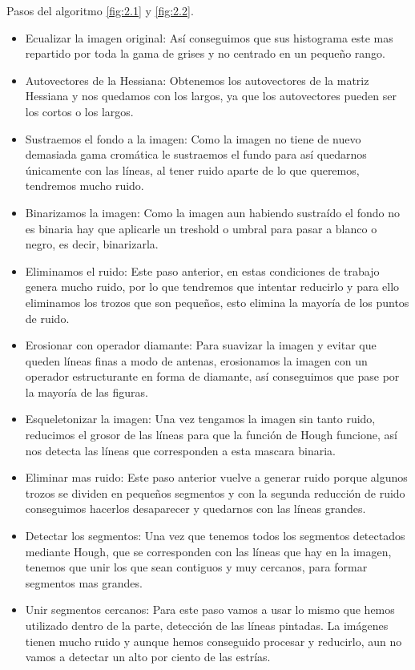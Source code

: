 Pasos del algoritmo \ref{fig:2.1} y \ref{fig:2.2}.
\begin{itemize}
	\item Ecualizar la imagen original:
Así conseguimos que sus histograma este mas repartido por toda la gama de grises y no centrado en un pequeño rango.
	\item Autovectores de la Hessiana:
Obtenemos los autovectores de la matriz Hessiana y nos quedamos con los largos, ya que los autovectores pueden ser los cortos o los largos. 
	\item Sustraemos el fondo a la imagen:
Como la imagen no tiene de nuevo demasiada gama cromática le sustraemos el fundo para así quedarnos únicamente con las líneas, al tener ruido aparte de lo que queremos, tendremos mucho ruido.
	\item Binarizamos la imagen:
Como la imagen aun habiendo sustraído el fondo no es binaria hay que aplicarle un treshold o umbral para pasar a blanco o negro, es decir, binarizarla.
	\item Eliminamos el ruido:
Este paso anterior, en estas condiciones de trabajo genera mucho ruido, por lo que tendremos que intentar reducirlo y para ello eliminamos los trozos que son pequeños, esto elimina la mayoría de los puntos de ruido.
	\item Erosionar con operador diamante:
Para suavizar la imagen y evitar que queden líneas finas a modo de antenas, erosionamos la imagen con un operador estructurante en forma de diamante, así conseguimos que pase por la mayoría de las figuras.
	\item Esqueletonizar la imagen:
Una vez tengamos la imagen sin tanto ruido, reducimos el grosor de las líneas para que la función de Hough funcione, así nos detecta las líneas que corresponden a esta mascara binaria.
	\item Eliminar mas ruido:
Este paso anterior vuelve a generar ruido porque algunos trozos se dividen en pequeños segmentos y con la segunda reducción de ruido conseguimos hacerlos desaparecer y quedarnos con las líneas grandes.
	\item Detectar los segmentos:
Una vez que tenemos todos los segmentos detectados mediante Hough, que se corresponden con las líneas que hay en la imagen, tenemos que unir los que sean contiguos y muy cercanos, para formar segmentos mas grandes.
	\item Unir segmentos cercanos:
Para este paso vamos a usar lo mismo que hemos utilizado dentro de la parte, detección de las líneas pintadas.
La imágenes tienen mucho ruido y aunque hemos conseguido procesar y reducirlo, aun no vamos a detectar un alto por ciento de las estrías.
\end{itemize}




